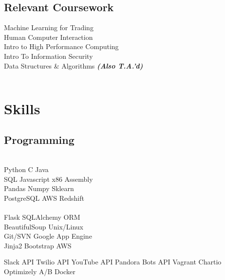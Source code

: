 \documentclass[]{deedy-resume-openfont}
\begin{document}
\begin{minipage}[t]{0.31\textwidth}
\subsection{Relevant Coursework}
Machine Learning for Trading \\
Human Computer Interaction \\
Intro to High Performance Computing \\
Intro To Information Security \\
Data Structures \& Algorithms {\footnotesize \textit{\textbf{(Also T.A.'d) }}} \\
\\[1\baselineskip]


\section{Skills}
\subsection{Programming}
\\[1\baselineskip]

Python \textbullet{}     C     \textbullet{} Java  
\\[1\baselineskip]

SQL \textbullet{} Javascript \textbullet{} x86 Assembly
\\[1\baselineskip]

Pandas \textbullet{} Numpy \textbullet{} Sklearn \\
PostgreSQL \textbullet{} AWS Redshift\\
\\[1\baselineskip]

Flask \textbullet{} SQLAlchemy ORM \\
\textbullet{} BeautifulSoup \textbullet{} Unix/Linux \\ 
Git/SVN \textbullet{} Google App Engine \\
\textbullet{} Jinja2 \textbullet{} Bootstrap \textbullet{} AWS\\
\sectionsep

  Slack API \textbullet{} Twilio API \textbullet{} YouTube API 
  Pandora Bots API \textbullet{}  Vagrant \textbullet{} Chartio 
  Optimizely A/B \textbullet{} Docker 
\\[1\baselineskip]


\end{minipage}
\end{document}
